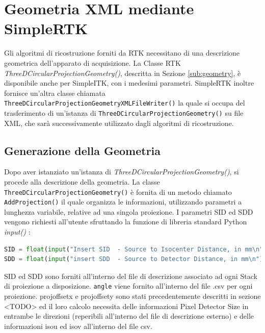 \documentclass[a4paper,12pt, doubleside]{report}
\begin{document}
        \section{Geometria XML mediante SimpleRTK}
      
            \par
                Gli algoritmi di ricostruzione forniti da RTK necessitano di una descrizione geometrica dell'apparato di acquisizione. La Classe RTK \textit{ThreeDCircularProjectionGeometry()}, descritta in Sezione \ref{sub:geometry}, è disponibile anche per SimpleITK, con i medesimi parametri. SimpleRTK inoltre fornisce un'altra classe chiamata \texttt{ThreeDCircularProjectionGeometryXMLFileWriter()} la quale si occupa del trasferimento di un'istanza di \texttt{ThreeDCircularProjectionGeometry()} su file XML, che sarà successivamente utilizzato dagli algoritmi di ricostruzione. 
                
            \subsection{Generazione della Geometria}
                \par
                    
                    Dopo aver istanziato un'istanza di \textit{ThreeDCircularProjectionGeometry()}, si procede alla descrizione della geometria. La classe \texttt{ThreeDCircularProjectionGeometry()} è fornita di un metodo chiamato \texttt{AddProjection()} il quale organizza le informazioni, utilizzando parametri a lunghezza variabile, relative ad una singola proiezione. I parametri SID ed SDD vengono richiesti all'utente sfruttando la funzione di libreria standard Python \textit{input()} \cite{input-python}:
                         
                    \begin{lstlisting}[language=python, frame=bt]
SID = float(input("Insert SID  - Source to Isocenter Distance, in mm\n"))
SDD = float(input("insert SDD  - Source to Detector Distance, in mm\n"))
                    \end{lstlisting}
                   
                    
                    
                   
                    SID ed SDD sono forniti all'interno del file di descrizione associato ad ogni Stack di proiezione a disposizione. \texttt{angle} viene fornito all'interno del file .csv per ogni proiezione. 
                    proj\textunderscore offset\textunderscore x e proj\textunderscore offset\textunderscore y sono stati precedentemente descritti in sezione <TODO> ed il loro calcolo necessita delle informazioni Pixel Detector Size in entrambe le direzioni (reperibili all'interno del file di descrizione esterno) e delle informazioni iso\textunderscore u ed iso\textunderscore v all'interno del file csv.
                    
\end{document}
